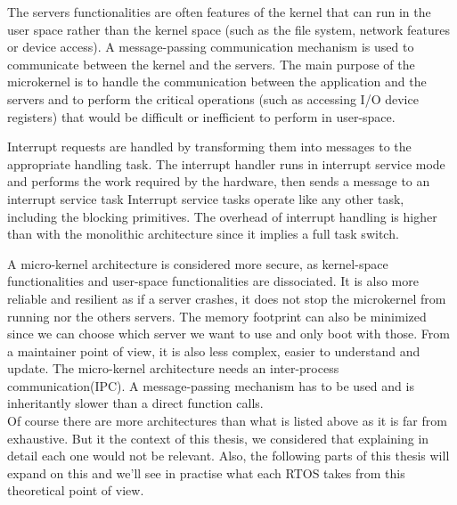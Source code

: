 The servers functionalities are often features of the kernel that can run in the user space
    rather than the kernel space (such as the file system, network features or device access).
A message-passing communication mechanism is used to communicate between the kernel and the servers.
The main purpose of the microkernel is to handle the communication between the application and the servers
    and to perform the critical operations (such as accessing I/O device registers) that would be difficult or inefficient to perform in user-space.

Interrupt requests are handled by transforming them into messages to the appropriate handling task.
The interrupt handler runs in interrupt service mode and performs the work required by the hardware, then sends a message to an interrupt service task
Interrupt service tasks operate like any other task, including the blocking primitives.
The overhead of interrupt handling is higher than with the monolithic architecture since it implies a full task switch.

A micro-kernel architecture is considered more secure, as kernel-space functionalities and user-space functionalities are dissociated.
It is also more reliable and resilient as if a server crashes, it does not stop the microkernel from running nor the others servers.
The memory footprint can also be minimized since we can choose which server we want to use and only boot with those.
From a maintainer point of view, it is also less complex, easier to understand and update.
The micro-kernel architecture needs an inter-process communication(IPC).
A message-passing mechanism has to be used and is inheritantly slower than a direct function calls.
\\

Of course there are more architectures than what is listed above as it is far from exhaustive.
But it the context of this thesis, we considered that explaining in detail each one would not be relevant.
Also, the following parts of this thesis will expand on this
    and we'll see in practise what each RTOS takes from this theoretical point of view.